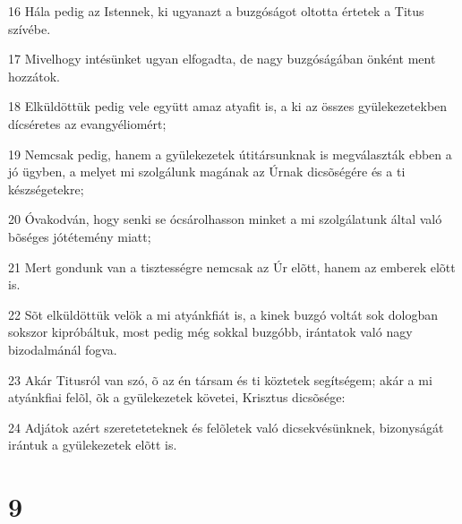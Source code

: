 \par 16 Hála pedig az Istennek, ki ugyanazt a buzgóságot oltotta  értetek a Titus szívébe.
\par 17 Mivelhogy intésünket ugyan elfogadta, de nagy buzgóságában önként ment hozzátok.
\par 18 Elküldöttük pedig vele együtt amaz atyafit is, a ki az összes gyülekezetekben dícséretes az evangyéliomért;
\par 19 Nemcsak pedig, hanem a gyülekezetek útitársunknak is megválaszták ebben a jó ügyben, a melyet mi szolgálunk magának az Úrnak dicsõségére és a ti készségetekre;
\par 20 Óvakodván, hogy senki se ócsárolhasson minket a mi szolgálatunk által való bõséges jótétemény miatt;
\par 21 Mert gondunk van a tisztességre nemcsak az Úr elõtt, hanem az emberek elõtt is.
\par 22 Sõt elküldöttük velök a mi atyánkfiát is, a kinek buzgó voltát sok dologban sokszor kipróbáltuk, most pedig még sokkal buzgóbb, irántatok való nagy bizodalmánál fogva.
\par 23 Akár Titusról van szó, õ az én társam és ti köztetek segítségem; akár a mi atyánkfiai felõl, õk a gyülekezetek követei,  Krisztus dicsõsége:
\par 24 Adjátok azért szereteteteknek és felõletek való dicsekvésünknek, bizonyságát irántuk a gyülekezetek elõtt is.

\chapter{9}

